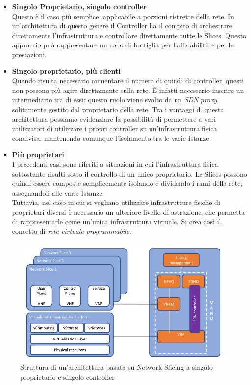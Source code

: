 \begin{itemize}
	
	\item \textbf{Singolo Proprietario, singolo controller}\\
	Questo è il caso più semplice, applicabile a porzioni ristrette della rete. In un'architettura di questo genere il Controller ha il compito di orchestrare direttamente l'infrastruttura e controllare direttamente tutte le Slices. Questo approccio può rappresentare un collo di bottiglia per l'affidabilità e per le prestazioni.
	\item \textbf{Singolo proprietario, più clienti}\\
	Quando risulta necessario aumentare il numero di quindi di controller, questi non possono più agire direttamente sulla rete. È infatti necessario inserire un intermediario tra di essi: questo ruolo viene svolto da un \textit{SDN proxy}, solitamente gestito dal proprietario della rete. Tra i vantaggi di questa architettura possiamo evidenziare la possibilità di permettere a vari utilizzatori di utilizzare i propri controller su un'infrastruttura fisica condivisa, mantenendo comunque l'isolamento tra le varie Istanze
	\item \textbf{Più proprietari}\\
	I precedenti casi sono riferiti a situazioni in cui l'infrastruttura fisica sottostante risulti sotto il controllo di un unico proprietario. Le Slices possono quindi essere composte semplicemente isolando e dividendo i rami della rete, assegnandoli alle varie Istanze.\\
	Tuttavia, nel caso in cui si vogliano utilizzare infrastrutture fisiche di proprietari diversi è necessario un ulteriore livello di astrazione, che permetta di rappresentarle come un'unica infrastruttura virtuale. Si crea così il concetto di \textit{rete virtuale programmabile}. \cite{libro1}\\
\end{itemize}
\begin{figure}
	\centering
	\includegraphics[width=0.9\linewidth]{../immagini/arch1}
	\caption[Architettura NS a singolo controller]{Struttura di un'architettura basata su Network Slicing a singolo proprietario e singolo controller}
	\label{fig:arch1}
\end{figure}
